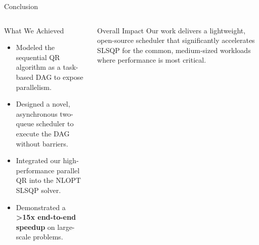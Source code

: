 \begin{frame}{Conclusion}

  \begin{columns}[c,onlytextwidth]
		\pause
		\begin{block}{What We Achieved}
		  \begin{itemize}
		    \item Modeled the sequential QR algorithm as a task-based DAG to expose parallelism.
		    \item Designed a novel, asynchronous two-queue scheduler to execute the DAG without barriers.
		    \item Integrated our high-performance parallel QR into the NLOPT SLSQP solver.
		    \item Demonstrated a \textbf{>15x end-to-end speedup} on large-scale problems.
		  \end{itemize}
		\end{block}
		
		\pause
  \begin{alertblock}{Overall Impact}
    \centering
    Our work delivers a lightweight, open-source scheduler that significantly accelerates SLSQP for the common, medium-sized workloads where performance is most critical.
  \end{alertblock}
    \end{columns}

\end{frame}